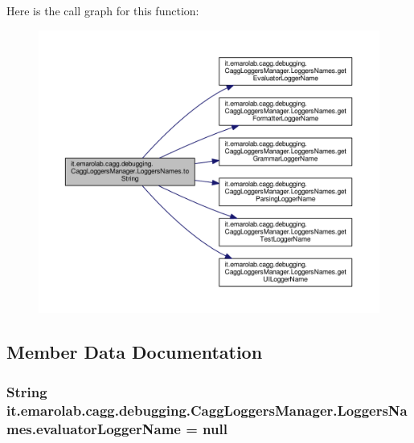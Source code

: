 Here is the call graph for this function\-:\nopagebreak
\begin{figure}[H]
\begin{center}
\leavevmode
\includegraphics[width=350pt]{classit_1_1emarolab_1_1cagg_1_1debugging_1_1CaggLoggersManager_1_1LoggersNames_a9ccf970435718635ca12286bb0a64b34_cgraph}
\end{center}
\end{figure}




\subsection{Member Data Documentation}
\hypertarget{classit_1_1emarolab_1_1cagg_1_1debugging_1_1CaggLoggersManager_1_1LoggersNames_a62aeb947a6157484d55639478f8e2826}{
\subsubsection[{evaluator\-Logger\-Name}]{\setlength{\rightskip}{0pt plus 5cm}String it.\-emarolab.\-cagg.\-debugging.\-Cagg\-Loggers\-Manager.\-Loggers\-Names.\-evaluator\-Logger\-Name = null\hspace{0.3cm}{\ttfamily [private]}}}\label{classit_1_1emarolab_1_1cagg_1_1debugging_1_1CaggLoggersManager_1_1LoggersNames_a62aeb947a6157484d55639478f8e2826}


